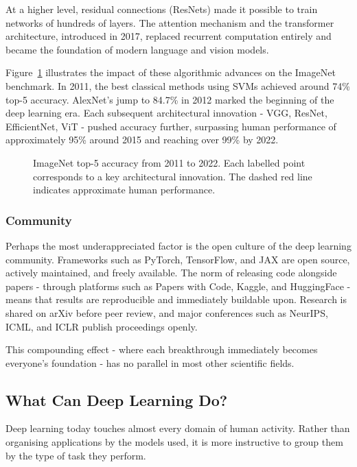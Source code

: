 At a higher level, residual connections (ResNets) made it possible to train networks of hundreds of layers. The attention mechanism and the transformer architecture, introduced in 2017, replaced recurrent computation entirely and became the foundation of modern language and vision models.

Figure~\ref{fig:imagenet_accuracy} illustrates the impact of these algorithmic advances on the ImageNet benchmark. In 2011, the best classical methods using SVMs achieved around 74\% top-5 accuracy. AlexNet's jump to 84.7\% in 2012 marked the beginning of the deep learning era. Each subsequent architectural innovation - VGG, ResNet, EfficientNet, ViT - pushed accuracy further, surpassing human performance of approximately 95\% around 2015 and reaching over 99\% by 2022.

\begin{figure}[h]
    \centering
    
    \caption{ImageNet top-5 accuracy from 2011 to 2022. Each labelled point corresponds to a key architectural innovation. The dashed red line indicates approximate human performance.}
    \label{fig:imagenet_accuracy}
\end{figure}

\subsubsection{Community}

Perhaps the most underappreciated factor is the open culture of the deep learning community. Frameworks such as PyTorch, TensorFlow, and JAX are open source, actively maintained, and freely available. The norm of releasing code alongside papers - through platforms such as Papers with Code, Kaggle, and HuggingFace - means that results are reproducible and immediately buildable upon. Research is shared on arXiv before peer review, and major conferences such as NeurIPS, ICML, and ICLR publish proceedings openly.

This compounding effect - where each breakthrough immediately becomes everyone's foundation - has no parallel in most other scientific fields.

\subsection{What Can Deep Learning Do?}

Deep learning today touches almost every domain of human activity. Rather than organising applications by the models used, it is more instructive to group them by the type of task they perform.

